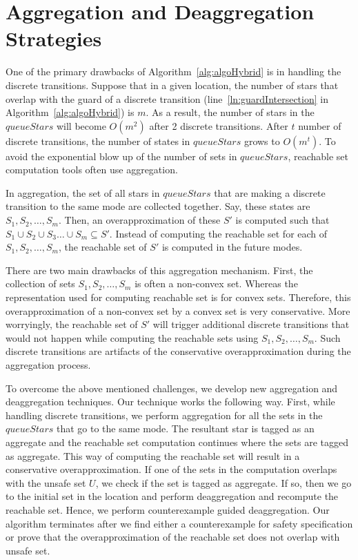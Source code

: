 \section{Aggregation and Deaggregation Strategies}
\label{sec:agdag}

One of the primary drawbacks of Algorithm~\ref{alg:algoHybrid} is in handling the discrete transitions. 
%
Suppose that in a given location, the number of stars that overlap with the guard of a discrete transition (line~\ref{ln:guardIntersection} in Algorithm~\ref{alg:algoHybrid}) is $m$.
%
As a result, the number of stars in the $queueStars$ will become $O(m^2)$ after 2 discrete transitions. After $t$ number of discrete transitions, the number of states in $queueStars$ grows to $O(m^t)$.
%
To avoid the exponential blow up of the number of sets in $queueStars$, reachable set computation tools often use aggregation.

In aggregation, the set of all stars in $queueStars$ that are making a discrete transition to the same mode are collected together. 
%
Say, these states are $S_1, S_2, \ldots, S_m$.
%
Then, an overapproximation of these $S'$ is computed such that $S_1 \cup S_2 \cup S_3 \ldots \cup S_m \subseteq S'$. 
%
Instead of computing the reachable set for each of $S_1, S_2, \ldots, S_m$, the reachable set of $S'$ is computed in the future modes.

There are two main drawbacks of this aggregation mechanism. 
%
First, the collection of sets $S_1, S_2, \ldots, S_m$ is often a non-convex set. 
%
Whereas the representation used for computing reachable set is for convex sets. 
%
Therefore, this overapproximation of a non-convex set by a convex set is very conservative.
%
More worryingly, the reachable set of $S'$ will trigger additional discrete transitions that would not happen while computing the reachable sets using $S_1, S_2, \ldots, S_m$.
%
Such discrete transitions are artifacts of the conservative overapproximation during the aggregation process.


To overcome the above mentioned challenges, we develop new aggregation and deaggregation techniques. Our technique works the following way. 
First, while handling discrete transitions, we perform aggregation for all the sets in the $queueStars$ that go to the same mode. 
%
The resultant star is tagged as an \textsf{aggregate} and the reachable set computation continues where the sets are tagged as \textsf{aggregate}. 
%
This way of computing the reachable set will result in a conservative overapproximation.
%
If one of the sets in the computation overlaps with the unsafe set $U$, we check if the set is tagged as \textsf{aggregate}.
%
If so, then we go to the initial set in the location and perform deaggregation and recompute the reachable set.
%
Hence, we perform counterexample guided deaggregation.
%
Our algorithm terminates after we find either a counterexample for safety specification or prove that the overapproximation of the reachable set does not overlap with unsafe set.

